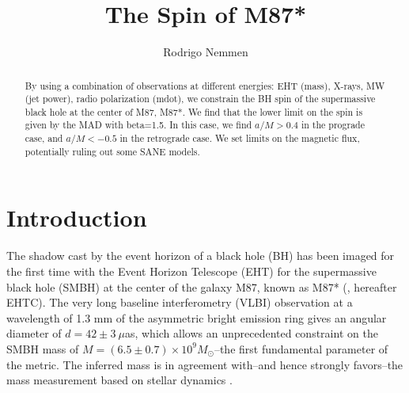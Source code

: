 \documentclass[twocolumn, linenumbers]{aastex62} %
\begin{document}
\title{The Spin of M87*}




\author{Rodrigo Nemmen}

\begin{abstract}
By using a combination of observations at different energies: EHT (mass), X-rays, MW (jet power), radio polarization (mdot), we constrain the BH spin of the supermassive black hole at the center of M87, M87*. 
We find that the lower limit on the spin is given by the MAD with beta=1.5. In this case, we find $a/M>0.4$ in the prograde case, and $a/M<-0.5$ in the retrograde case. 
We set limits on the magnetic flux, potentially ruling out some SANE models.
\end{abstract}






\section{Introduction} \label{sec:intro}

The shadow cast by the event horizon of a black hole (BH) has been imaged for the first time with the Event Horizon Telescope (EHT) for the supermassive black hole (SMBH) at the center of the galaxy M87, known as M87* (\citealt{EHTC2019}, hereafter EHTC). The very long baseline interferometry (VLBI) observation at a wavelength of 1.3 mm of the asymmetric bright emission ring gives an angular diameter of $d=42 \pm 3 \ \mu$as, which allows an unprecedented constraint on the SMBH mass of $M=(6.5 \pm 0.7) \times 10^9 M_\odot$--the first fundamental parameter of the \cite{Kerr1963} metric. The inferred mass is in agreement with--and hence strongly favors--the mass measurement based on stellar dynamics \citep{Gebhardt2011}. 
\end{document}
